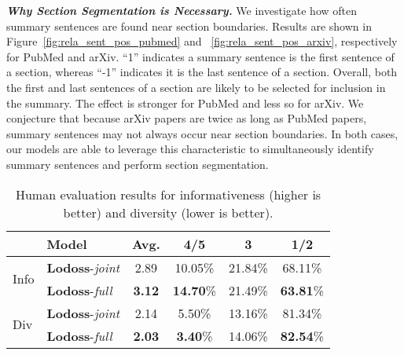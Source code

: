 \documentclass[11pt]{article}
\begin{document}
\vspace{0.05in}
\noindent\textbf{\textsl{Why Section Segmentation is Necessary.}}\quad
We investigate how often summary sentences are found near section boundaries. 
Results are shown in Figure~\ref{fig:rela_sent_pos_pubmed} and ~\ref{fig:rela_sent_pos_arxiv}, respectively for PubMed and arXiv.
``1'' indicates a summary sentence is the first sentence of a section,
whereas ``-1'' indicates it is the last sentence of a section.
Overall, both the first and last sentences of a section are likely to be
selected for inclusion in the summary.
The effect is stronger for PubMed and less so for arXiv. 
We conjecture that because arXiv papers are twice as long as PubMed papers,
summary sentences may not always occur near section boundaries. 
In both cases, our models are able to leverage this characteristic to simultaneously identify summary sentences and perform section segmentation.




\begin{table}[!t]
\setlength{\tabcolsep}{3.8pt}
\renewcommand{\arraystretch}{1.1}
\centering
\footnotesize
\begin{small}
\begin{tabular}{|ll|c|c|c|c|}
\hline
& \textbf{Model} & \textbf{Avg.} & \textbf{4/5} & \textbf{3} & \textbf{1/2} \\
\hline
\hline
\multirow{2}{*}{{Info}} & \textbf{Lodoss}-\emph{joint}& 2.89 & 10.05\% & 21.84\% & 68.11\%\\
& \textbf{Lodoss}-\emph{full}& \textbf{3.12} & \textbf{14.70}\% & 21.49\% & \textbf{63.81}\%\\
\hline
\hline
\multirow{2}{*}{{Div}} & \textbf{Lodoss}-\emph{joint}& 2.14  & 5.50\% & 13.16\% & 81.34\%\\
& \textbf{Lodoss}-\emph{full}& \textbf{2.03} & \textbf{3.40}\% & 14.06\% & \textbf{82.54}\%\\
\hline
\end{tabular}
\end{small}
\vspace{-0.05in}
\caption{Human evaluation results for informativeness (higher is better) and diversity (lower is better).}
\label{tab:human_eval}
\end{table}
\end{document}

